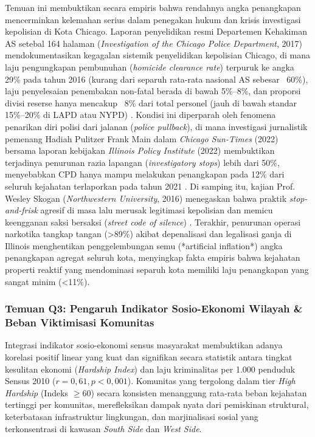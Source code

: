 \documentclass[11pt,a4paper]{article}
\begin{document}
Temuan ini membuktikan secara empiris bahwa rendahnya angka penangkapan mencerminkan kelemahan serius dalam penegakan hukum dan krisis investigasi kepolisian di Kota Chicago. Laporan penyelidikan resmi Departemen Kehakiman AS setebal 164 halaman (\textit{Investigation of the Chicago Police Department}, 2017) mendokumentasikan kegagalan sistemik penyelidikan kepolisian Chicago, di mana laju pengungkapan pembunuhan (\textit{homicide clearance rate}) terpuruk ke angka 29\% pada tahun 2016 (kurang dari separuh rata-rata nasional AS sebesar ~60\%), laju penyelesaian penembakan non-fatal berada di bawah 5\%--8\%, dan proporsi divisi reserse hanya mencakup ~8\% dari total personel (jauh di bawah standar 15\%--20\% di LAPD atau NYPD) \cite{doj2017}. Kondisi ini diperparah oleh fenomena penarikan diri polisi dari jalanan (\textit{police pullback}), di mana investigasi jurnalistik pemenang Hadiah Pulitzer Frank Main dalam \textit{Chicago Sun-Times} (2022) bersama laporan kebijakan \textit{Illinois Policy Institute} (2022) membuktikan terjadinya penurunan razia lapangan (\textit{investigatory stops}) lebih dari 50\%, menyebabkan CPD hanya mampu melakukan penangkapan pada 12\% dari seluruh kejahatan terlaporkan pada tahun 2021 \cite{main2022, ipi2022}. Di samping itu, kajian Prof. Wesley Skogan (\textit{Northwestern University}, 2016) menegaskan bahwa praktik \textit{stop-and-frisk} agresif di masa lalu merusak legitimasi kepolisian dan memicu keengganan saksi bersaksi (\textit{street code of silence}) \cite{skogan2016}. Terakhir, penurunan operasi narkotika tangkap tangan (>89\%) akibat depenalisasi dan legalisasi ganja di Illinois menghentikan penggelembungan semu (*artificial inflation*) angka penangkapan agregat seluruh kota, menyingkap fakta empiris bahwa kejahatan properti reaktif yang mendominasi separuh kota memiliki laju penangkapan yang sangat minim (<11\%).

\subsubsection{Temuan Q3: Pengaruh Indikator Sosio-Ekonomi Wilayah \& Beban Viktimisasi Komunitas}
Integrasi indikator sosio-ekonomi sensus masyarakat membuktikan adanya korelasi positif linear yang kuat dan signifikan secara statistik antara tingkat kesulitan ekonomi (\textit{Hardship Index}) dan laju kriminalitas per 1.000 penduduk Sensus 2010 ($r = 0,61, p < 0,001$). Komunitas yang tergolong dalam tier \textit{High Hardship} (Indeks $\ge 60$) secara konsisten menanggung rata-rata beban kejahatan tertinggi per komunitas, merefleksikan dampak nyata dari pemiskinan struktural, keterbatasan infrastruktur lingkungan, dan marjinalisasi sosial yang terkonsentrasi di kawasan \textit{South Side} dan \textit{West Side}.
\end{document}
